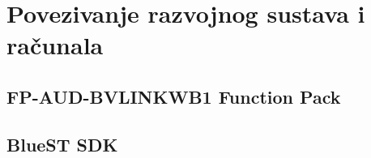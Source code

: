 \chapter{Povezivanje razvojnog sustava i računala}

\section{FP-AUD-BVLINKWB1 Function Pack}

\section{BlueST SDK}